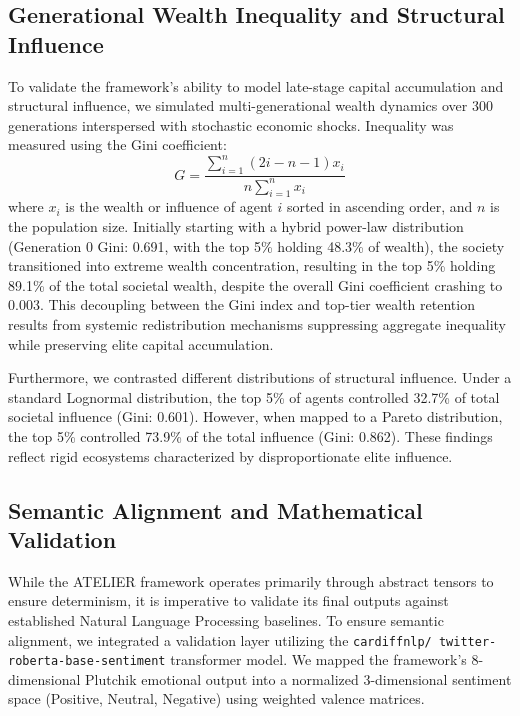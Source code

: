 \documentclass[12pt]{IEEEtran}
\begin{document}
\subsection{Generational Wealth Inequality and Structural Influence}
To validate the framework's ability to model late-stage capital accumulation and structural influence, we simulated multi-generational wealth dynamics over 300 generations interspersed with stochastic economic shocks. Inequality was measured using the Gini coefficient:
\begin{equation}
G = \frac{\sum_{i=1}^{n} (2i - n - 1) x_i}{n \sum_{i=1}^{n} x_i}
\end{equation}
where $x_i$ is the wealth or influence of agent $i$ sorted in ascending order, and $n$ is the population size. Initially starting with a hybrid power-law distribution (Generation 0 Gini: 0.691, with the top 5\% holding 48.3\% of wealth), the society transitioned into extreme wealth concentration, resulting in the top 5\% holding 89.1\% of the total societal wealth, despite the overall Gini coefficient crashing to 0.003. This decoupling between the Gini index and top-tier wealth retention results from systemic redistribution mechanisms suppressing aggregate inequality while preserving elite capital accumulation.

Furthermore, we contrasted different distributions of structural influence. Under a standard Lognormal distribution, the top 5\% of agents controlled 32.7\% of total societal influence (Gini: 0.601). However, when mapped to a Pareto distribution, the top 5\% controlled 73.9\% of the total influence (Gini: 0.862). These findings reflect rigid ecosystems characterized by disproportionate elite influence.

\subsection{Semantic Alignment and Mathematical Validation}
While the ATELIER framework operates primarily through abstract tensors to ensure determinism, it is imperative to validate its final outputs against established Natural Language Processing baselines. To ensure semantic alignment, we integrated a validation layer utilizing the \texttt{cardiffnlp/ twitter-roberta-base-sentiment} transformer model. We mapped the framework's 8-dimensional Plutchik emotional output into a normalized 3-dimensional sentiment space (Positive, Neutral, Negative) using weighted valence matrices.
\end{document}
